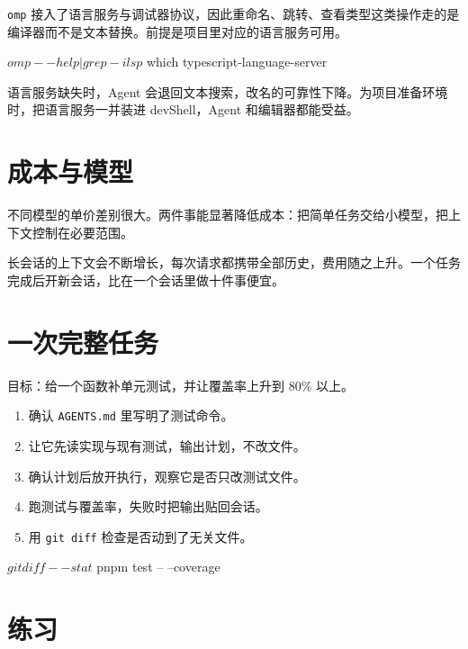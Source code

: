 \texttt{omp} 接入了语言服务与调试器协议，因此重命名、跳转、查看类型这类操作走的是编译器而不是文本替换。前提是项目里对应的语言服务可用。

\begin{shellsession}
$ omp --help | grep -i lsp
$ which typescript-language-server
\end{shellsession}

语言服务缺失时，Agent 会退回文本搜索，改名的可靠性下降。为项目准备环境时，把语言服务一并装进 devShell，Agent 和编辑器都能受益。

\section{成本与模型}

不同模型的单价差别很大。两件事能显著降低成本：把简单任务交给小模型，把上下文控制在必要范围。


长会话的上下文会不断增长，每次请求都携带全部历史，费用随之上升。一个任务完成后开新会话，比在一个会话里做十件事便宜。

\section{一次完整任务}

目标：给一个函数补单元测试，并让覆盖率上升到 80\% 以上。

\begin{enumerate}
  \item 确认 \texttt{AGENTS.md} 里写明了测试命令。
  \item 让它先读实现与现有测试，输出计划，不改文件。
  \item 确认计划后放开执行，观察它是否只改测试文件。
  \item 跑测试与覆盖率，失败时把输出贴回会话。
  \item 用 \texttt{git diff} 检查是否动到了无关文件。
\end{enumerate}

\begin{shellsession}
$ git diff --stat
$ pnpm test -- --coverage
\end{shellsession}

\section{练习}

